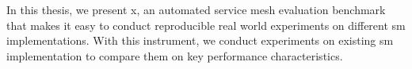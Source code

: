 In this thesis, we present x, an automated service mesh evaluation benchmark that makes it easy to conduct reproducible real world experiments on different \gls{sm} implementations. With this instrument, we conduct experiments on existing \gls{sm} implementation to compare them on key performance characteristics.







